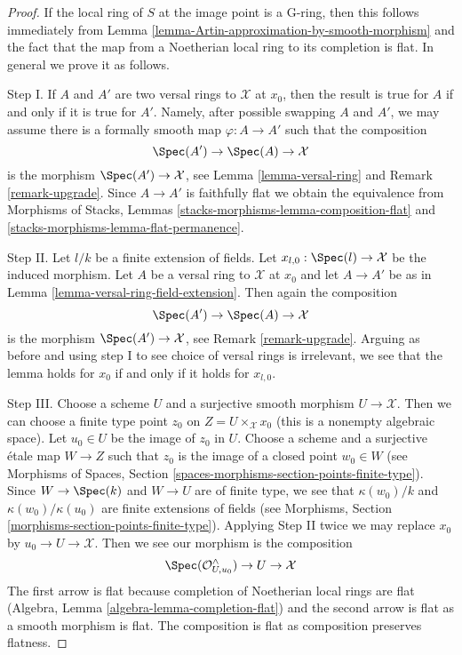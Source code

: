 \begin{proof}
If the local ring of $S$ at the image point is a G-ring, then this
follows immediately from
Lemma \ref{lemma-Artin-approximation-by-smooth-morphism}
and the fact that the map from a Noetherian local ring to its
completion is flat. In general we prove it as follows.

\medskip\noindent
Step I. If $A$ and $A'$ are two versal rings to $\mathcal{X}$ at $x_0$,
then the result is true for $A$ if and only if it is true for $A'$.
Namely, after possible swapping $A$ and $A'$, we may assume there is
a formally smooth map $\varphi : A \to A'$ such that the composition
$$
\Spec(A') \to \Spec(A) \to \mathcal{X}
$$
is the morphism $\Spec(A') \to \mathcal{X}$, see
Lemma \ref{lemma-versal-ring} and
Remark \ref{remark-upgrade}.
Since $A \to A'$ is faithfully flat we obtain the equivalence from
Morphisms of Stacks, Lemmas \ref{stacks-morphisms-lemma-composition-flat} and
\ref{stacks-morphisms-lemma-flat-permanence}.

\medskip\noindent
Step II. Let $l/k$ be a finite extension of fields. Let
$x_{l, 0} : \Spec(l) \to \mathcal{X}$ be the induced morphism.
Let $A$ be a versal ring to $\mathcal{X}$ at $x_0$ and
let $A \to A'$ be as in Lemma \ref{lemma-versal-ring-field-extension}.
Then again the composition
$$
\Spec(A') \to \Spec(A) \to \mathcal{X}
$$
is the morphism $\Spec(A') \to \mathcal{X}$, see Remark \ref{remark-upgrade}.
Arguing as before and using step I to see choice of versal rings
is irrelevant, we see that the lemma holds for $x_0$ if and only
if it holds for $x_{l, 0}$.

\medskip\noindent
Step III. Choose a scheme $U$ and a surjective smooth morphism
$U \to \mathcal{X}$. Then we can choose a finite type point
$z_0$ on $Z = U \times_\mathcal{X} x_0$ (this is a nonempty
algebraic space). Let $u_0 \in U$ be the image of $z_0$ in $U$.
Choose a scheme and a surjective \'etale map $W \to Z$
such that $z_0$ is the image of a closed point $w_0 \in W$
(see Morphisms of Spaces, Section
\ref{spaces-morphisms-section-points-finite-type}).
Since $W \to \Spec(k)$ and $W \to U$ are of finite type,
we see that $\kappa(w_0)/k$ and $\kappa(w_0)/\kappa(u_0)$
are finite extensions of fields
(see Morphisms, Section \ref{morphisms-section-points-finite-type}).
Applying Step II twice we may replace $x_0$ by
$u_0 \to U \to \mathcal{X}$. Then we see our morphism is the composition
$$
\Spec(\mathcal{O}_{U, u_0}^\wedge) \to U \to \mathcal{X}
$$
The first arrow is flat because completion of Noetherian local rings
are flat (Algebra, Lemma \ref{algebra-lemma-completion-flat})
and the second arrow is flat as
a smooth morphism is flat. The composition is flat as composition
preserves flatness.
\end{proof}

